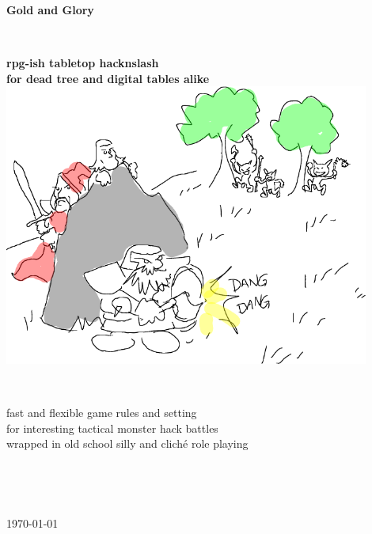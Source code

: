 \begin{titlepage}
\thispagestyle{empty}

\begin{center}

   \vspace{4 cm} %

   \textbf{\Huge{Gold and Glory}}

   \ %

   \textbf{\Large{rpg-ish tabletop hacknslash\\
             for dead tree and digital tables alike}}\\


   \vspace{2 cm} %
   \includegraphics[width=120mm]{./figs/sneaky-plan.png}

   \vspace{2 cm} %


   \ %

   \large{
       fast and flexible game rules and setting\\
       for interesting tactical monster hack battles\\
       wrapped in old school silly and cliché role playing
   }



   \vfill %


   \ %



   \ %

   \normalsize{\today}

\end{center}


\end{titlepage}
